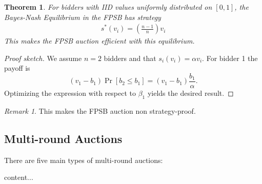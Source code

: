 \documentclass[12pt]{article}
\newtheorem{theorem}{Theorem}
\theoremstyle{definition}
\theoremstyle{remark}
\newtheorem*{remark}{Remark}
\begin{document}
\begin{theorem}
	For bidders with IID values uniformly distributed on $[0,1]$, the Bayes-Nash Equilibrium in the FPSB has strategy
	\begin{align*}
		s^*(v_i) = \left(\frac{n-1}{n}\right)v_i
	\end{align*}
	This makes the FPSB auction efficient with this equilibrium.
\end{theorem}

\begin{proof}[Proof sketch]
We assume $n=2$ bidders and that $s_i(v_i) = \alpha v_i$. For bidder 1 the payoff is $$(v_1 - b_1) \Pr \left[b_2\leq b_1\right] = (v_1 - b_1 ) \frac{b_1}{\alpha}.$$ Optimizing the expression with respect to $\beta_1$ yields the desired result.
\end{proof}

\begin{remark}
	This makes the FPSB auction non strategy-proof.
\end{remark}

\subsection*{Multi-round Auctions}

There are five main types of multi-round auctions:

\begin{itemize}
	content...
\end{itemize}
\end{document}
